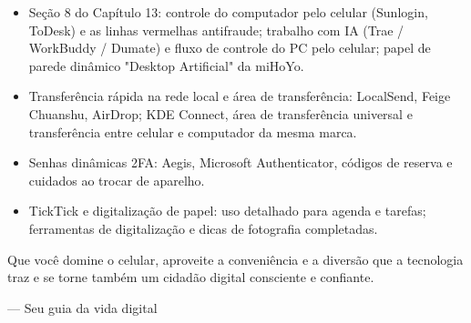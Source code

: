 
\begin{itemize}
  \item Seção 8 do Capítulo 13: controle do computador pelo celular (Sunlogin, ToDesk) e as linhas vermelhas antifraude; trabalho com IA (Trae / WorkBuddy / Dumate) e fluxo de controle do PC pelo celular; papel de parede dinâmico "Desktop Artificial" da miHoYo.
  \item Transferência rápida na rede local e área de transferência: LocalSend, Feige Chuanshu, AirDrop; KDE Connect, área de transferência universal e transferência entre celular e computador da mesma marca.
  \item Senhas dinâmicas 2FA: Aegis, Microsoft Authenticator, códigos de reserva e cuidados ao trocar de aparelho.
  \item TickTick e digitalização de papel: uso detalhado para agenda e tarefas; ferramentas de digitalização e dicas de fotografia completadas.
\end{itemize}

Que você domine o celular, aproveite a conveniência e a diversão que a tecnologia traz e se torne também um cidadão digital consciente e confiante.

— Seu guia da vida digital
